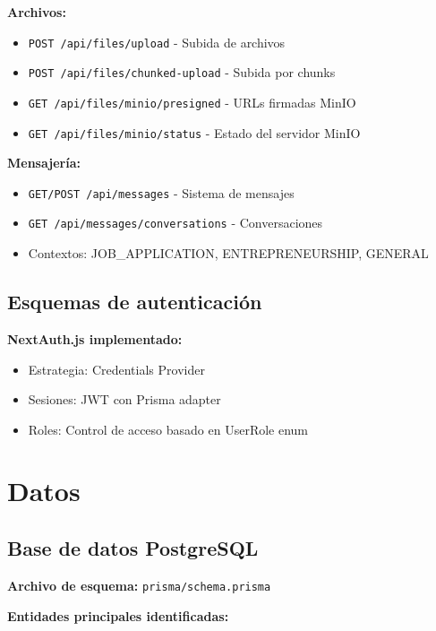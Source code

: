 \documentclass[12pt,a4paper]{article}
\begin{document}
\textbf{Archivos:}
\begin{itemize}
    \item \texttt{POST /api/files/upload} - Subida de archivos
    \item \texttt{POST /api/files/chunked-upload} - Subida por chunks
    \item \texttt{GET /api/files/minio/presigned} - URLs firmadas MinIO
    \item \texttt{GET /api/files/minio/status} - Estado del servidor MinIO
\end{itemize}

\textbf{Mensajería:}
\begin{itemize}
    \item \texttt{GET/POST /api/messages} - Sistema de mensajes
    \item \texttt{GET /api/messages/conversations} - Conversaciones
    \item Contextos: JOB\_APPLICATION, ENTREPRENEURSHIP, GENERAL
\end{itemize}

\subsection{Esquemas de autenticación}

\textbf{NextAuth.js implementado:}
\begin{itemize}
    \item Estrategia: Credentials Provider
    \item Sesiones: JWT con Prisma adapter
    \item Roles: Control de acceso basado en UserRole enum
\end{itemize}

\section{Datos}

\subsection{Base de datos PostgreSQL}

\textbf{Archivo de esquema:} \texttt{prisma/schema.prisma}

\textbf{Entidades principales identificadas:}
\end{document}
